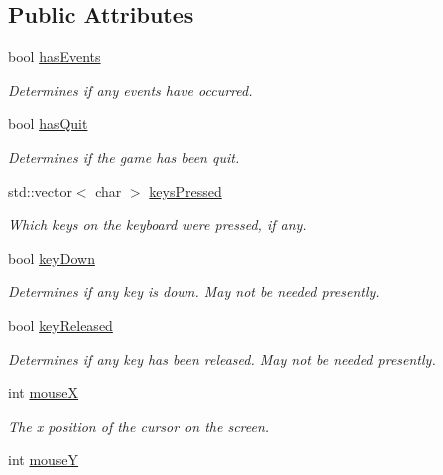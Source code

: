 \subsection*{Public Attributes}
\begin{DoxyCompactItemize}
\item 
bool \hyperlink{structevents_1_1game_event_a96b2729eb6d01e42431da7ac1a4d28a2}{has\+Events}
\begin{DoxyCompactList}\small\item\em Determines if any events have occurred. \end{DoxyCompactList}\item 
bool \hyperlink{structevents_1_1game_event_a201a773c16c73b1c8e5101274cc4de97}{has\+Quit}
\begin{DoxyCompactList}\small\item\em Determines if the game has been quit. \end{DoxyCompactList}\item 
std\+::vector$<$ char $>$ \hyperlink{structevents_1_1game_event_ac32c30a19cd0332094317a2f42e25b4b}{keys\+Pressed}
\begin{DoxyCompactList}\small\item\em Which keys on the keyboard were pressed, if any. \end{DoxyCompactList}\item 
bool \hyperlink{structevents_1_1game_event_a81ecfd12bec9ce82b20462df4442c6c0}{key\+Down}
\begin{DoxyCompactList}\small\item\em Determines if any key is down. May not be needed presently. \end{DoxyCompactList}\item 
bool \hyperlink{structevents_1_1game_event_adaac56b596a9462763fc6504c0059fb9}{key\+Released}
\begin{DoxyCompactList}\small\item\em Determines if any key has been released. May not be needed presently. \end{DoxyCompactList}\item 
int \hyperlink{structevents_1_1game_event_a0d128e01aa0f7a2d1dec15b3753872e2}{mouse\+X}
\begin{DoxyCompactList}\small\item\em The x position of the cursor on the screen. \end{DoxyCompactList}\item 
int \hyperlink{structevents_1_1game_event_adbeaaa754e8cd4d5895ac37162d0bd6d}{mouse\+Y}

\end{DoxyCompactItemize}
